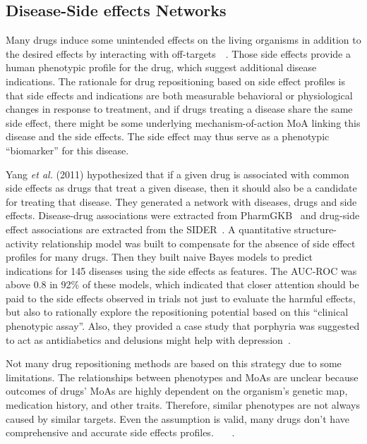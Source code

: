 \subsection{Disease-Side effects Networks}

Many drugs induce some unintended effects on the living organisms in addition to the desired effects by interacting with off-targets~\cite{wu_network-based_2013}~\cite{yang_finding_2008}. Those side effects provide a human phenotypic profile for the drug, which suggest additional disease indications. The rationale for drug repositioning based on side effect profiles is that side effects and indications are both measurable behavioral or physiological changes in response to treatment, and if drugs treating a disease share the same side effect, there might be some underlying mechanism-of-action \ac{MoA} linking this disease and the side effects. The side effect may thus serve as a phenotypic “biomarker” for this disease.

Yang \textit{et al.} (2011) hypothesized that if a given drug is associated with common side effects as drugs that treat a given disease, then it should also be a candidate for treating that disease. They generated a network with diseases, drugs and side effects. Disease-drug associations were extracted from PharmGKB~\cite{thorn_pharmgkb:_2013} and drug-side effect associations are extracted from the \ac{SIDER}~\cite{kuhn_sider_2016}. A quantitative structure-activity relationship model was built to compensate for the absence of side effect profiles for many drugs. Then they built naive Bayes models to predict indications for 145 diseases using the side effects as features. The \ac{AUC-ROC} was above 0.8 in 92\% of these models, which indicated that closer attention should be paid to the side effects observed in trials not just to evaluate the harmful effects, but also to rationally explore the repositioning potential based on this “clinical phenotypic assay”. Also, they provided a case study that porphyria was suggested to act as antidiabetics and delusions might help with depression~\cite{yang_systematic_2011}.

Not many drug repositioning methods are based on this strategy due to some limitations. The relationships between phenotypes and \ac{MoA}s are unclear because outcomes of drugs' MoAs are highly dependent on the organism’s genetic map, medication history, and other traits. Therefore, similar phenotypes are not always caused by similar targets. Even the assumption is valid, many drugs don't have comprehensive and accurate side effects profiles. ~\cite{dai_survey_2015}~\cite{wu_network-based_2013}~\cite{lotfi_shahreza_review_2018}.

